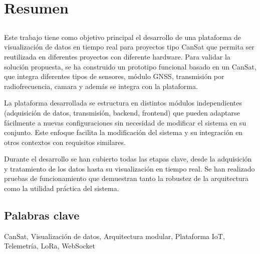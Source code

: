 \chapter*{Resumen}


\section*{\tituloPortadaVal}

Este trabajo tiene como objetivo principal el desarrollo de una plataforma de visualización de datos en tiempo real para proyectos tipo CanSat que permita ser reutilizada en diferentes proyectos con diferente hardware.
Para validar la solución propuesta, se ha construido un prototipo funcional basado en un CanSat, que integra diferentes tipos de sensores, módulo GNSS, transmisión por radiofrecuencia, camara y además se integra con la plataforma.

La plataforma desarrollada se estructura en distintos módulos independientes (adquisición de datos, transmisión, backend, frontend) que pueden adaptarse fácilmente a nuevas configuraciones sin necesidad de modificar el sistema en su conjunto.
Este enfoque facilita la modificación del sistema y su integración en otros contextos con requisitos similares.

Durante el desarrollo se han cubierto todas las etapas clave, desde la adquisición y tratamiento de los datos hasta su visualización en tiempo real.
Se han realizado pruebas de funcionamiento que demuestran tanto la robustez de la arquitectura como la utilidad práctica del sistema.


\section*{Palabras clave}

\noindent CanSat, Visualización de datos, Arquitectura modular, Plataforma IoT, Telemetría, LoRa, WebSocket


   


